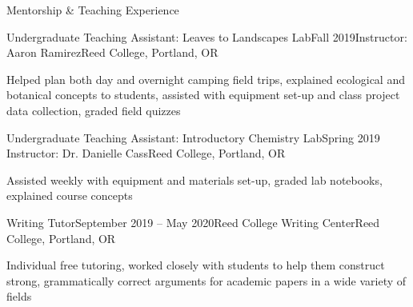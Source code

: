 \documentclass{resume} %
\begin{document}
\begin{rSection}{Mentorship \& Teaching Experience}
\begin{rSubsection}{Undergraduate Teaching Assistant: Leaves to Landscapes Lab}{Fall 2019}{Instructor: Aaron Ramirez}{Reed College, Portland, OR}
\item Helped plan both day and overnight camping field trips, explained ecological and botanical concepts to students, assisted with equipment set-up and class project data collection, graded field quizzes
\end{rSubsection}


\begin{rSubsection}{Undergraduate Teaching Assistant: Introductory Chemistry Lab}{Spring 2019} {Instructor: Dr. Danielle Cass}{Reed College, Portland, OR}
\item Assisted weekly with equipment and materials set-up, graded lab notebooks, explained course concepts

\end{rSubsection}


\begin{rSubsection}{Writing Tutor}{September 2019 -- May 2020}{Reed College Writing Center}{Reed College, Portland, OR}
\item Individual free tutoring, worked closely with students to help them construct strong, grammatically correct arguments for academic papers in a wide variety of fields
\end{rSubsection}


\end{rSection}
\end{document}

